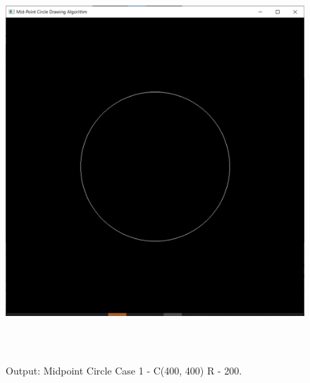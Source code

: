 \documentclass[12pt, a4]{article}
\begin{document}
\subsection*{}
\begin{figure}[h]
\centering
\caption{Output: Midpoint Circle Case 1 - C(400, 400) R - 200.}
\includegraphics[height=15cm, width=15cm]{MidpointCircle/Outputs/Circle-1.png}
\end{figure}

\newpage
\end{document}
